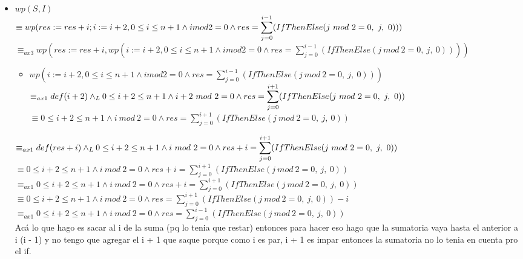 \documentclass{article}
\begin{document}
\begin{itemize}
\begin{enumerate}
        \begin{itemize}
            \item $wp(S, I)$\\
            $\equiv wp(res := res + i; i:= i + 2, 0 \leq i \leq n + 1 \land i mod 2 = 0 \land res = \displaystyle\displaystyle\sum_{j=0}^{i-1} (IfThenElse(j\ mod\ 2 = 0,\ j,\ 0)))$\\
            $\equiv_{ax3} wp(res := res + i, wp(i:= i + 2, 0 \leq i \leq n + 1 \land i mod 2 = 0 \land res = \displaystyle\sum_{j=0}^{i-1} (IfThenElse(j\ mod\ 2 = 0,\ j,\ 0))))$
            \begin{itemize}
                \item $wp(i:= i + 2, 0 \leq i \leq n + 1 \land i mod 2 = 0 \land res = \displaystyle\sum_{j=0}^{i-1} (IfThenElse(j\ mod\ 2 = 0,\ j,\ 0)))$\\
                $\equiv_{ax1} def(i+2) \yLuego 0 \leq i + 2 \leq n + 1 \land i + 2\ mod\ 2 = 0 \land res = \displaystyle\displaystyle\sum_{j =0}^{i + 1}(IfThenElse(j\ mod\ 2 = 0,\ j,\ 0))$\\
                $\equiv 0 \leq i + 2 \leq n + 1 \land i\ mod\ 2 = 0 \land res = \displaystyle\sum_{j =0}^{i + 1}(IfThenElse(j\ mod\ 2 = 0,\ j,\ 0))$
            \end{itemize}
            $\equiv_{ax1} def(res + i) \land _L 0 \leq i + 2 \leq n + 1 \land i\ mod\ 2 = 0 \land res + i = \displaystyle\sum_{j =0}^{i + 1}(IfThenElse(j\ mod\ 2 = 0,\ j,\ 0))$\\
            $\equiv 0 \leq i + 2 \leq n + 1 \land i\ mod\ 2 = 0 \land res + i = \displaystyle\sum_{j =0}^{i + 1}(IfThenElse(j\ mod\ 2 = 0,\ j,\ 0))$\\
            $\equiv_{ax1} 0 \leq i + 2 \leq n + 1 \land i\ mod\ 2 = 0 \land res + i = \displaystyle\sum_{j =0}^{i + 1}(IfThenElse(j\ mod\ 2 = 0,\ j,\ 0))$\\
            $\equiv 0 \leq i + 2 \leq n + 1 \land i\ mod\ 2 = 0 \land res = \displaystyle\sum_{j =0}^{i + 1}(IfThenElse(j\ mod\ 2 = 0,\ j,\ 0)) - i$\\
            $\equiv_{ax1} 0 \leq i + 2 \leq n + 1 \land i\ mod\ 2 = 0 \land res = \displaystyle\sum_{j =0}^{i - 1}(IfThenElse(j\ mod\ 2 = 0,\ j,\ 0))$\\
            Ac\'a lo que hago es sacar al i de la suma (pq lo tenia que restar) entonces para hacer eso hago que la sumatoria vaya hasta el anterior a i (i - 1) y no tengo que agregar el i + 1 que saque porque como i es par, i + 1 es impar entonces la sumatoria no lo tenia en cuenta pro el if.

\end{itemize}
\end{enumerate}
\end{itemize}
\end{document}
